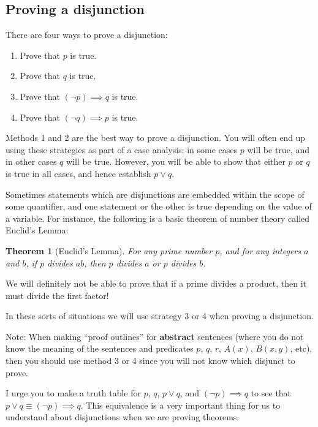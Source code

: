 \documentclass{article}
\newtheorem*{Theorem}{Theorem}
\begin{document}
\newpage

\subsection{Proving a disjunction}

There are four ways to prove a disjunction:
\begin{enumerate}
		\item Prove that $p$ is true.
		\item Prove that $q$ is true.
		\item Prove that $(\neg p) \implies q$ is true.
		\item Prove that $(\neg q) \implies p$ is true. 
	\end{enumerate}

Methods 1 and 2 are the best way to prove a disjunction.  You will often end up using these strategies as part of a case analysis:  in some cases $p$ will be true, and in other cases $q$ will be true.  However, you will be able to show that either $p$ or $q$ is true in all cases, and hence establish $p \vee q$.  

Sometimes statements which are disjunctions are embedded within the scope of some quantifier, and one statement or the other is true depending on the value of a variable.  For instance, the following is a basic theorem of number theory called Euclid's Lemma:



\begin{Theorem}[Euclid's Lemma]
		For any prime number $p$,  and for any integers $a$ and $b$, if $p$ divides $ab$, then $p$ divides $a$ or $p$ divides $b$.
	\end{Theorem}

We will definitely not be able to prove that if a prime divides a product, then it must divide the first factor!  

In these sorts of situations we will use strategy 3 or 4 when proving a disjunction.

Note:  When making ``proof outlines'' for \textbf{abstract} sentences (where you do not know the meaning of the sentences and predicates $p$, $q$, $r$, $A(x)$, $B(x,y)$, etc), then you should use method 3 or 4 since you will not know which disjunct to prove.

I urge you to make a truth table for $p$, $q$, $p \vee q$, and $(\neg p) \implies q$ to see that $p \vee q \equiv (\neg p) \implies q$.  This equivalence is a very important thing for us to understand about disjunctions when we are proving theorems.
\end{document}
